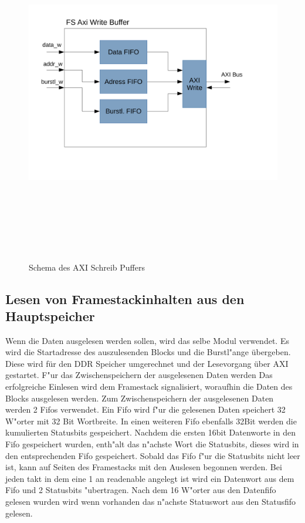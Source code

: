 \begin{figure}
	\centering
	\includegraphics[height = 15cm]{PS_RS_graphics/Axi Write Buffer.pdf}
	\caption{Schema des AXI Schreib Puffers}
\end{figure}

\subsection{Lesen von Framestackinhalten aus den Hauptspeicher}
Wenn die Daten ausgelesen werden sollen, wird das selbe Modul verwendet. Es wird die Startadresse des auszulesenden Blocks und die Burstl"ange \"ubergeben. Diese wird f\"ur den DDR Speicher umgerechnet und der Lesevorgang \"uber AXI gestartet. F"ur das Zwischenspeichern der ausgelesenen Daten werden  Das erfolgreiche Einlesen wird dem Framestack signalisiert, woraufhin die Daten des Blocks ausgelesen werden. Zum Zwischenspeichern der ausgelesenen Daten werden 2 Fifos verwendet. Ein Fifo wird f"ur die gelesenen Daten speichert 32 W"orter mit 32 Bit Wortbreite. In einen weiteren Fifo ebenfalls 32Bit werden die kumulierten Statusbits gespeichert. Nachdem die ersten 16bit Datenworte in den Fifo gespeichert wurden, enth"alt das n"achste Wort die Statusbits, dieses wird in den entsprechenden Fifo gespeichert. Sobald das Fifo f"ur die Statusbits nicht leer ist, kann auf Seiten des Framestacks mit den Auslesen begonnen werden. Bei jeden takt in dem eine 1 an readenable angelegt ist wird ein Datenwort aus dem Fifo und 2 Statusbits "ubertragen. Nach dem 16 W"orter aus den Datenfifo gelesen wurden wird wenn vorhanden das n"achste Statuswort aus den Statusfifo gelesen. 

